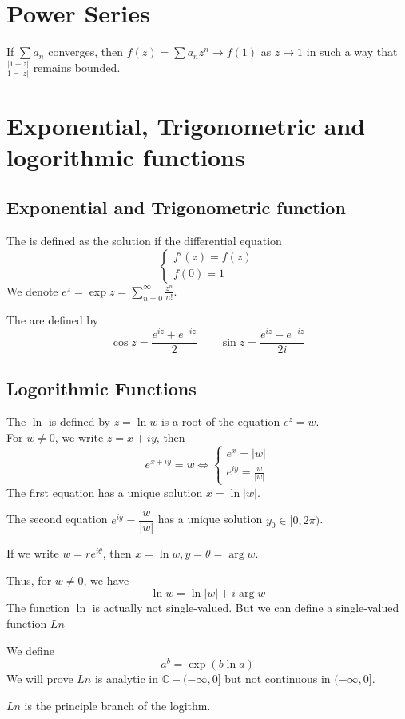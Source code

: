 \section{Power Series}
\begin{theorem}
If  $ \sum a_n  $ converges, then  $ f(z)=\sum a_nz^n\rightarrow f(1)  $ as  $ z\rightarrow 1  $ in such a way that  $ \frac{|1-z| }{1-|z| } $ remains bounded.
\end{theorem}
\section{Exponential, Trigonometric and logorithmic functions}
\subsection{Exponential and Trigonometric function}
The  is defined as the solution if the differential equation
\[\left\{
    \begin{aligned}
        f'(z)=f(z)\\
        f(0)=1
    \end{aligned}
\right.\]
We denote  $ e^z=\exp z=\sum\limits_{n=0}^\infty \frac{z^n}{n!} $.

The  are defined by 
\[\cos z=\frac{e^{iz}+e^{-iz}}{2}\qquad \sin z=\frac{e^{iz}-e^{-iz}}{2i}\]
\subsection{Logorithmic Functions}
The   $ \ln  $ is defined by  $ z=\ln w  $ is a root of the equation  $ e^z=w $.\\
For  $ w\not=0 $, we write  $ z=x+iy $, then 
\[e^{x+iy}=w\Leftrightarrow 
\left\{
    \begin{aligned}
        e^x=|w|\\
        e^{iy}=\frac{w }{|w|}
    \end{aligned}
\right.\]   
The first equation has a unique solution  $ x=\ln|w|  $.

The second equation  $ e^{iy}=\dfrac{w }{|w|}  $ has a unique solution  $ y_0\in [0,2\pi) $.

If we write  $ w=re^{i\theta} $, then  $ x=\ln w,y=\theta =\arg w $.

Thus, for  $ w\not=0  $, we have 
\[\ln w=\ln|w|+i\arg w\]
The function  $ \ln  $ is actually not single-valued. But we can define a single-valued function  $ Ln $ 

We define 
\[a^b=\exp(b\ln a)\]   
We will prove  $ Ln  $ is analytic in  $ \mathbb{C}-(-\infty,0] $ but not continuous in  $ (-\infty,0] $.

 $ Ln  $ is the principle branch of the logithm.   